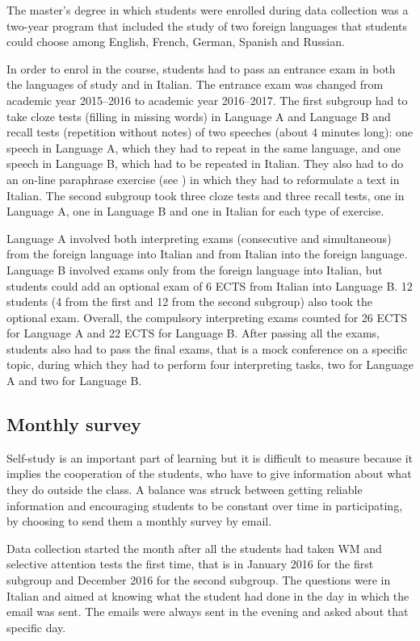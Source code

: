 \documentclass[output=paper]{../langscibook}
\begin{document}
The master’s degree in which students were enrolled during data collection was a two-year program that included the study of two foreign languages that students could choose among English, French, German, Spanish and Russian.

In order to enrol in the course, students had to pass an entrance exam in both the languages of study and in Italian. The entrance exam was changed from academic year 2015--2016 to academic year 2016--2017. The first subgroup had to take cloze tests (filling in missing words) in Language A and Language B and recall tests (repetition without notes) of two speeches (about 4 minutes long): one speech in Language A, which they had to repeat in the same language, and one speech in Language B, which had to be repeated in Italian. They also had to do an on-line paraphrase exercise (see ) in which they had to reformulate a text in Italian. The second subgroup took three cloze tests and three recall tests, one in Language A, one in Language B and one in Italian for each type of exercise.

Language A involved both interpreting exams (consecutive and simultaneous) from the foreign language into Italian and from Italian into the foreign language. Language B involved exams only from the foreign language into Italian, but students could add an optional exam of 6 ECTS from Italian into Language B. 12 students (4 from the first and 12 from the second subgroup) also took the optional exam. Overall, the compulsory interpreting exams counted for 26 ECTS for Language A and 22 ECTS for Language B. After passing all the exams, students also had to pass the final exams, that is a mock conference on a specific topic, during which they had to perform four interpreting tasks, two for Language A and two for Language B.



\subsection{Monthly survey}

Self-study is an important part of learning but it is difficult to measure because it implies the cooperation of the students, who have to give information about what they do outside the class. A balance was struck between getting reliable information and encouraging students to be constant over time in participating, by choosing to send them a monthly survey by email.

Data collection started the month after all the students had taken WM and selective attention tests the first time, that is in January 2016 for the first subgroup and December 2016 for the second subgroup. The questions were in Italian and aimed at knowing what the student had done in the day in which the email was sent. The emails were always sent in the evening and asked about that specific day.
\end{document}
